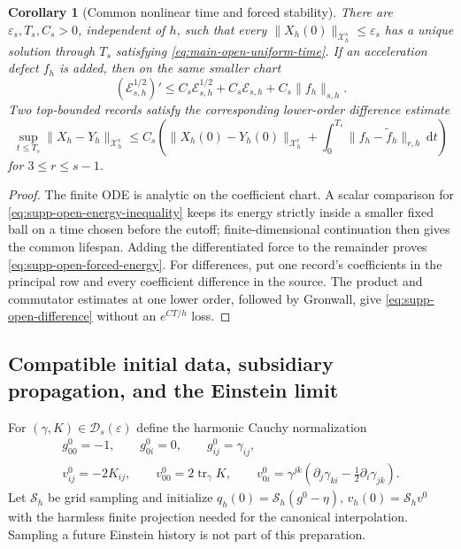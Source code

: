 \documentclass[11pt]{article}
\newtheorem{corollary}[corollary]{Corollary}
\theoremstyle{definition}
\theoremstyle{remark}
\newcommand{\dd}{\mathrm d}
\newcommand{\tr}{\operatorname{tr}}
\begin{document}
\begin{corollary}[Common nonlinear time and forced stability]
\label{cor:supp-open-lifespan}
There are $\varepsilon_s,T_s,C_s>0$, independent of $h$, such that every
$\|X_h(0)\|_{\mathcal X_h^s}\le\varepsilon_s$ has a unique solution through
$T_s$ satisfying \eqref{eq:main-open-uniform-time}.  If an acceleration defect
$f_h$ is added, then on the same smaller chart
\begin{equation}
 (\mathscr E_{s,h}^{1/2})'
 \le C_s\mathscr E_{s,h}^{1/2}+C_s\mathscr E_{s,h}
       +C_s\|f_h\|_{s,h}.
 \label{eq:supp-open-forced-energy}
\end{equation}
Two top-bounded records satisfy the corresponding lower-order difference
estimate
\begin{equation}
 \sup_{t\le T_s}\|X_h-Y_h\|_{\mathcal X_h^r}
 \le C_s\left(\|X_h(0)-Y_h(0)\|_{\mathcal X_h^r}
 +\int_0^{T_s}\|f_h-\widetilde f_h\|_{r,h}\,\dd t\right)
 \label{eq:supp-open-difference}
\end{equation}
for $3\le r\le s-1$.
\end{corollary}
\begin{proof}
The finite ODE is analytic on the coefficient chart.  A scalar comparison for
\eqref{eq:supp-open-energy-inequality} keeps its energy strictly inside a
smaller fixed ball on a time chosen before the cutoff; finite-dimensional
continuation then gives the common lifespan.  Adding the differentiated force
to the remainder proves \eqref{eq:supp-open-forced-energy}.  For differences,
put one record's coefficients in the principal row and every coefficient
difference in the source.  The product and commutator estimates at one lower
order, followed by Gronwall, give \eqref{eq:supp-open-difference} without an
$e^{CT/h}$ loss.
\end{proof}

\subsection{Compatible initial data, subsidiary propagation, and the Einstein limit}

For $(\gamma,K)\in\mathcal D_s(\varepsilon)$ define the harmonic Cauchy
normalization
\begin{equation}
 \begin{gathered}
 g_{00}^0=-1,\qquad g_{0i}^0=0,\qquad g_{ij}^0=\gamma_{ij},\\
 v_{ij}^0=-2K_{ij},\qquad v_{00}^0=2\tr_\gamma K,\qquad
 v_{0i}^0=\gamma^{jk}(\partial_j\gamma_{ki}
                         -\tfrac12\partial_i\gamma_{jk}).
 \end{gathered}
 \label{eq:supp-open-harmonic-initial}
\end{equation}
Let $\mathcal S_h$ be grid sampling and initialize
$q_h(0)=\mathcal S_h(g^0-\eta)$, $v_h(0)=\mathcal S_hv^0$ with the harmless
finite projection needed for the canonical interpolation.  Sampling a
future Einstein history is not part of this preparation.
\end{document}
